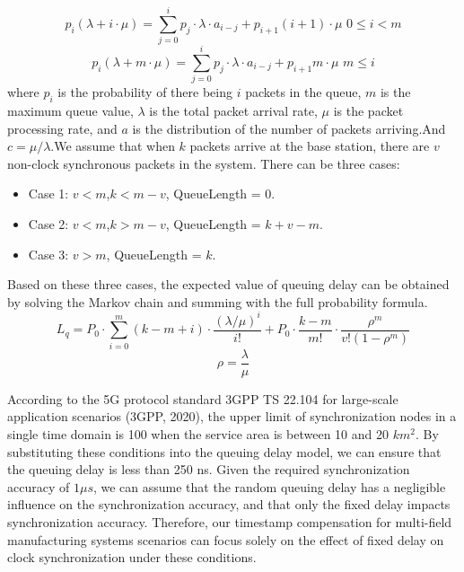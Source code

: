 \documentclass[english]{cccconf}
\begin{document}
{\begin{equation*}
	p_i\left( \lambda +i\cdot \mu \right) =\sum_{j=0}^i{p_j\cdot \lambda \cdot a_{i-j}+p_{i+1}\left( i+1 \right) \cdot \mu\,\, 0\leqslant i<m}
\end{equation*}
\begin{equation}
	p_i\left( \lambda +m\cdot \mu \right) =\sum_{j=0}^i{p_j\cdot \lambda \cdot a_{i-j}+p_{i+1}m\cdot \mu}\,\, m\leqslant i
\end{equation}
where $p_i$ is the probability of there being $i$ packets in the queue, $m$ is the maximum queue value, $\lambda$ is the total packet arrival rate, $\mu$ is the packet processing rate, and $a$ is the distribution of the number of packets arriving.And $c=\mu/\lambda $.We assume that when $k$ packets arrive at the base station, there are $v$ non-clock synchronous packets in the system. There can be three cases:
\begin{itemize}
	\item Case 1: $v<m$,$k<m-v$, QueueLength = 0.
	\item Case 2: $v<m$,$k>m-v$, QueueLength = $k+v-m$.
	\item Case 3: $v>m$, QueueLength = $k$.
\end{itemize}

Based on these three cases, the expected value of queuing delay can be obtained by solving the Markov chain and summing with the full probability formula.
\begin{equation*}
	L_q=P_0\cdot \sum_{i=0}^m{\left(k-m+i\right)\cdot \frac{\left(\lambda/\mu\right)^i}{i!}+P_0\cdot \frac{k-m}{m!}\cdot \frac{\rho^m}{v!\left(1-\rho^m\right)}}
\end{equation*}
\begin{equation}
	\rho=\frac{\lambda}{\mu}
\end{equation}

According to the 5G protocol standard 3GPP TS 22.104 for large-scale application scenarios (3GPP, 2020), the upper limit of synchronization nodes in a single time domain is 100 when the service area is between 10 and 20 $km^2$\cite{888889}. By substituting these conditions into the queuing delay model, we can ensure that the queuing delay is less than 250 ns. Given the required synchronization accuracy of $1\mu s$, we can assume that the random queuing delay has a negligible influence on the synchronization accuracy, and that only the fixed delay impacts synchronization accuracy. Therefore, our timestamp compensation for multi-field manufacturing systems scenarios can focus solely on the effect of fixed delay on clock synchronization under these conditions.

}
\end{document}
